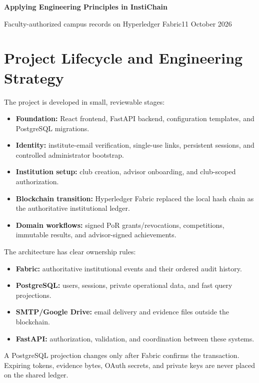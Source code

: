 \documentclass[10pt,a4paper]{article}
\begin{document}
{\fontsize{22}{24}\selectfont\bfseries\color{navy} Applying Engineering Principles in InstiChain}\par
\vspace{2pt}
{\large Faculty-authorized campus records on Hyperledger Fabric}\hfill{\small 11 October 2026}

\section{Project Lifecycle and Engineering Strategy}

The project is developed in small, reviewable stages:

\begin{itemize}
  \item \textbf{Foundation:} React frontend, FastAPI backend, configuration templates, and PostgreSQL migrations.
  \item \textbf{Identity:} institute-email verification, single-use links, persistent sessions, and controlled administrator bootstrap.
  \item \textbf{Institution setup:} club creation, advisor onboarding, and club-scoped authorization.
  \item \textbf{Blockchain transition:} Hyperledger Fabric replaced the local hash chain as the authoritative institutional ledger.
  \item \textbf{Domain workflows:} signed PoR grants/revocations, competitions, immutable results, and advisor-signed achievements.
\end{itemize}

The architecture has clear ownership rules:

\begin{itemize}
  \item \textbf{Fabric:} authoritative institutional events and their ordered audit history.
  \item \textbf{PostgreSQL:} users, sessions, private operational data, and fast query projections.
  \item \textbf{SMTP/Google Drive:} email delivery and evidence files outside the blockchain.
  \item \textbf{FastAPI:} authorization, validation, and coordination between these systems.
\end{itemize}

A PostgreSQL projection changes only after Fabric confirms the transaction. Expiring tokens, evidence bytes, OAuth secrets, and private keys are never placed on the shared ledger.
\end{document}
